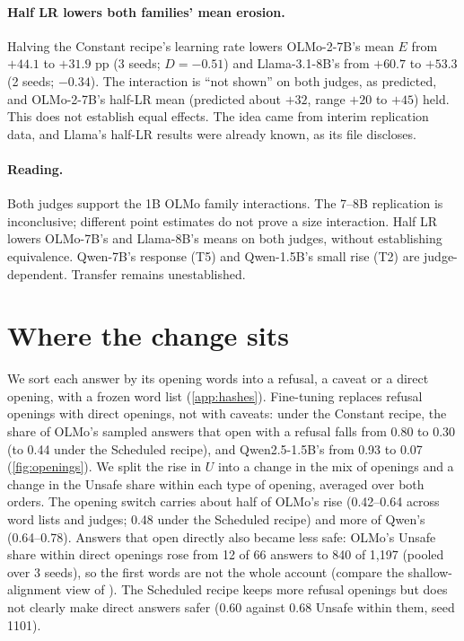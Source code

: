 \documentclass{article}
\begin{document}
\paragraph{Half LR lowers both families' mean erosion.} Halving the Constant
recipe's learning rate lowers OLMo-2-7B's mean $E$ from $+44.1$ to $+31.9$ pp
(3 seeds; $D = -0.51$) and Llama-3.1-8B's from $+60.7$ to $+53.3$ (2 seeds;
$-0.34$). The interaction is ``not shown'' on both judges, as predicted, and
OLMo-2-7B's half-LR mean (predicted about $+32$, range $+20$ to $+45$) held.
This does not establish equal effects. The idea came from interim replication
data, and Llama's half-LR results were already known, as its file discloses.

\paragraph{Reading.} Both judges support the 1B OLMo family interactions.
The 7--8B replication is inconclusive; different point estimates do not prove
a size interaction. Half LR lowers OLMo-7B's and Llama-8B's means on both
judges, without establishing equivalence. Qwen-7B's response (T5) and
Qwen-1.5B's small rise (T2) are judge-dependent. Transfer remains unestablished.

\section{Where the change sits}
\label{sec:openings}

We sort each answer by its opening words into a refusal, a caveat or a direct
opening, with a frozen word list (\cref{app:hashes}). Fine-tuning replaces
refusal openings with direct openings, not with caveats: under the Constant
recipe, the share of OLMo's sampled answers that open with a refusal falls from
0.80 to 0.30 (to 0.44 under the Scheduled recipe), and Qwen2.5-1.5B's from
0.93 to 0.07 (\cref{fig:openings}). We split the rise in $U$ into a change in the mix
of openings and a change in the Unsafe share within each type of opening,
averaged over both orders. The opening switch carries about half of OLMo's
rise (0.42--0.64 across word lists and judges; 0.48 under the Scheduled
recipe) and more of Qwen's (0.64--0.78). Answers that open directly also
became less safe: OLMo's Unsafe share within direct openings rose from 12 of 66
answers to 840 of 1,197 (pooled over 3 seeds), so the first words are not the
whole account (compare the shallow-alignment view of \citet{qi2025shallow}).
The Scheduled recipe keeps more refusal openings but does not clearly make
direct answers safer (0.60 against 0.68 Unsafe within them, seed 1101).
\end{document}
